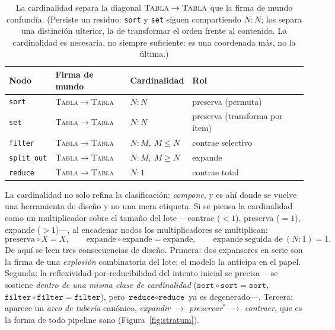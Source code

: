 \documentclass[11pt,a4paper]{article}
\theoremstyle{definition}
\theoremstyle{plain}
\newcommand{\mundo}[1]{\textsc{#1}}   %
\begin{document}
\begin{table}[h]
\centering
\small
\begin{tabular}{@{}llll@{}}
\toprule
Nodo & Firma de mundo & Cardinalidad & Rol \\
\midrule
\texttt{sort}       & \mundo{Tabla}$\to$\mundo{Tabla} & $N{:}N$          & preserva (permuta) \\
\texttt{set}        & \mundo{Tabla}$\to$\mundo{Tabla} & $N{:}N$          & preserva (transforma por ítem) \\
\texttt{filter}     & \mundo{Tabla}$\to$\mundo{Tabla} & $N{:}M,\ M\le N$ & contrae selectivo \\
\texttt{split\_out} & \mundo{Tabla}$\to$\mundo{Tabla} & $N{:}M,\ M\ge N$ & expande \\
\texttt{reduce}     & \mundo{Tabla}$\to$\mundo{Tabla} & $N{:}1$          & contrae total \\
\bottomrule
\end{tabular}
\caption{La cardinalidad separa la diagonal $\mundo{Tabla}\to\mundo{Tabla}$ que la
firma de mundo confundía. (Persiste un residuo: \texttt{sort} y \texttt{set} siguen
compartiendo $N{:}N$; los separa una distinción ulterior, la de transformar el orden
frente al contenido. La cardinalidad es necesaria, no siempre suficiente: es una
coordenada más, no la última.)}
\label{tab:card}
\end{table}

La cardinalidad no solo refina la clasificación: \emph{compone}, y es ahí donde se
vuelve una herramienta de diseño y no una mera etiqueta. Si se piensa la
cardinalidad como un multiplicador sobre el tamaño del lote ---contrae ($<1$),
preserva ($=1$), expande ($>1$)---, al encadenar nodos los multiplicadores se
multiplican:
\[
  \text{preserva}\circ X = X, \qquad
  \text{expande}\circ\text{expande} = \text{expande}, \qquad
  \text{expande}\ \text{seguida de}\ (N{:}1) = 1.
\]
De aquí se leen tres consecuencias de diseño. Primera: dos expansores en serie son
la firma de una \emph{explosión} combinatoria del lote; el modelo la anticipa en el
papel. Segunda: la reflexividad-por-reducibilidad del intento inicial se precisa
---se sostiene \emph{dentro de una misma clase de cardinalidad} ($\texttt{sort}\circ
\texttt{sort}=\texttt{sort}$, $\texttt{filter}\circ\texttt{filter}=\texttt{filter}$),
pero $\texttt{reduce}\circ\texttt{reduce}$ ya es degenerado---. Tercera: aparece un
\emph{arco de tubería} canónico, \emph{expandir $\to$ preservar$^*$ $\to$ contraer},
que es la forma de todo pipeline sano (Figura~\ref{fig:stratum}).
\end{document}
